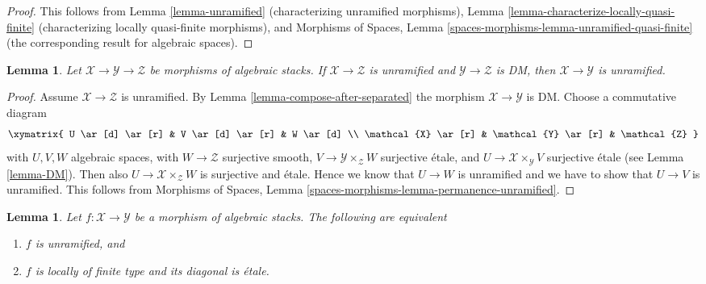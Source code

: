 \documentclass{stacks-project}
\theoremstyle{plain}
\newtheorem{lemma}[subsection]{Lemma}
\theoremstyle{definition}
\theoremstyle{remark}
\numberwithin{equation}{subsection}
\begin{document}
\begin{proof}
This follows from
Lemma \ref{lemma-unramified} (characterizing unramified morphisms),
Lemma \ref{lemma-characterize-locally-quasi-finite} (characterizing
locally quasi-finite morphisms), and
Morphisms of Spaces, Lemma
\ref{spaces-morphisms-lemma-unramified-quasi-finite} (the corresponding
result for algebraic spaces).
\end{proof}

\begin{lemma}
\label{lemma-permanence-unramified}
Let $\mathcal{X} \to \mathcal{Y} \to \mathcal{Z}$ be
morphisms of algebraic stacks.
If $\mathcal{X} \to \mathcal{Z}$ is unramified and
$\mathcal{Y} \to \mathcal{Z}$ is DM, then
$\mathcal{X} \to \mathcal{Y}$ is unramified.
\end{lemma}

\begin{proof}
Assume $\mathcal{X} \to \mathcal{Z}$ is unramified. By
Lemma \ref{lemma-compose-after-separated} the morphism
$\mathcal{X} \to \mathcal{Y}$ is DM. Choose a commutative diagram
$$
\xymatrix{
U \ar[d] \ar[r] & V \ar[d] \ar[r] & W \ar[d] \\
\mathcal{X} \ar[r] & \mathcal{Y} \ar[r] & \mathcal{Z}
}
$$
with $U, V, W$ algebraic spaces,
with $W \to \mathcal{Z}$ surjective smooth,
$V \to \mathcal{Y} \times_\mathcal{Z} W$ surjective \'etale, and
$U \to \mathcal{X} \times_\mathcal{Y} V$ surjective \'etale
(see Lemma \ref{lemma-DM}). Then also
$U \to \mathcal{X} \times_\mathcal{Z} W$ is surjective and \'etale.
Hence we know that $U \to W$ is unramified and we have to show that
$U \to V$ is unramified. This follows from
Morphisms of Spaces, Lemma \ref{spaces-morphisms-lemma-permanence-unramified}.
\end{proof}

\begin{lemma}
\label{lemma-characterize-unramified}
Let $f : \mathcal{X} \to \mathcal{Y}$ be a morphism of algebraic stacks.
The following are equivalent
\begin{enumerate}
\item $f$ is unramified, and
\item $f$ is locally of finite type and its diagonal is \'etale.
\end{enumerate}
\end{lemma}
\end{document}
